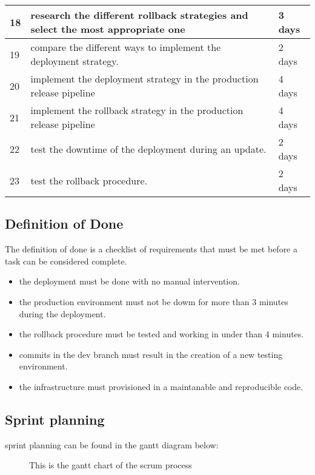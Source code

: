 \begin{longtable}[c]{
    |p{}
    |p{}|
    p{}|
    }
    18  & research the different rollback strategies and select the most appropriate one       & 3 days \\ \hline
    19  & compare the different ways to implement the deployment strategy.                     & 2 days \\ \hline
    20  & implement the deployment strategy in the production release pipeline                 & 4 days \\ \hline
    21  & implement the rollback strategy in the production release pipeline                   & 4 days \\ \hline
    22  & test the downtime of the deployment during an update.                                & 2 days \\ \hline
    23  & test the rollback procedure.                                                         & 2 days \\ \hline
\end{longtable}

\subsection{Definition of Done}
The definition of done is a checklist of requirements that must be met before a task can be considered complete.

\begin{itemize}
    \item the deployment must be done with no manual intervention.
    \item the production environment must not be dowm for more than 3 minutes during the deployment.
    \item the rollback procedure must be tested and working in under than 4 minutes.
    \item commits in the dev branch must result in the creation of a new testing environment.
    \item the infrastructure must provisioned in a maintanable and reproducible code.
\end{itemize}

\subsection{Sprint planning}
sprint planning can be found in the gantt diagram below:

\begin{figure}[htbp]
    \centering
    \caption{This is the gantt chart of the scrum process}
    \label{fig:gantt_chart}
\end{figure}

